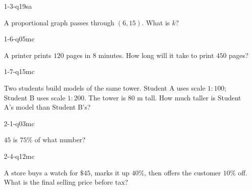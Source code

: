 
\begin{practiceQuestion}{1-3-q19}{sa}
\begin{questionText}
A proportional graph passes through $(6, 15)$. What is $k$?
\end{questionText}
\end{practiceQuestion}

\begin{practiceQuestion}{1-6-q05}{mc}
\begin{questionText}
A printer prints $120$ pages in $8$ minutes. How long will it take to print $450$ pages?
\end{questionText}
\end{practiceQuestion}

\begin{practiceQuestion}{1-7-q15}{mc}
\begin{questionText}
Two students build models of the same tower. Student A uses scale $1 : 100$; Student B uses scale $1 : 200$. The tower is $80$ m tall. How much taller is Student A's model than Student B's?
\end{questionText}
\end{practiceQuestion}

\begin{practiceQuestion}{2-1-q03}{mc}
\begin{questionText}
$45$ is $75\%$ of what number?
\end{questionText}
\end{practiceQuestion}

\begin{practiceQuestion}{2-4-q12}{mc}
\begin{questionText}
A store buys a watch for $\$45$, marks it up $40\%$, then offers the customer $10\%$ off. What is the final selling price before tax?
\end{questionText}
\end{practiceQuestion}

